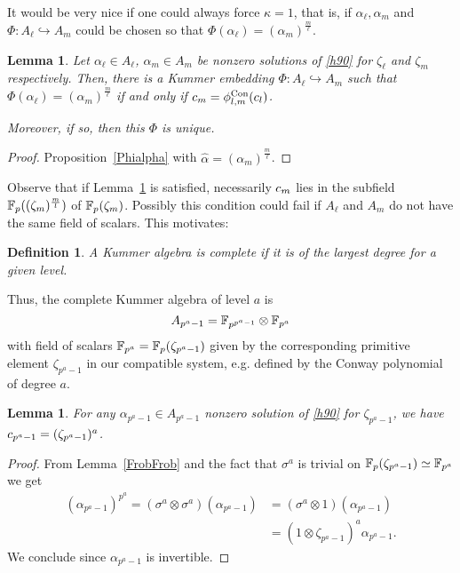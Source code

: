 \documentclass{sig-alternate}
\newtheorem{lemma}[theorem]{Lemma}
\newtheorem{definition}[theorem]{Definition}
\begin{document}
It would be very nice if one could always force $\kappa=1$, that is, if $\alpha_\ell,\alpha_m$
and $\Phi:A_\ell\hookrightarrow A_m$
could be chosen so that $\Phi(\alpha_\ell)=(\alpha_m)^{\frac{m}{\ell}}$.
\begin{lemma}
\label{power_compatibily}
Let $\alpha_\ell\in A_\ell$, $\alpha_m\in A_m$ be nonzero solutions of \eqref{h90} for $\zeta_\ell$
and $\zeta_m$ respectively. Then, there is a Kummer embedding $\Phi:A_\ell\hookrightarrow A_m$
such that $\Phi(\alpha_\ell)=(\alpha_m)^{\frac{m}{\ell}}$ if and only if $c_m={\phi^{\textrm{Con}}_{{l},{m}}}(c_l)$.

Moreover, if so, then this $\Phi$ is unique.
\end{lemma}
\begin{proof}
Proposition~\ref{Phialpha} with $\hat{\alpha}=(\alpha_m)^{\frac{m}{\ell}}$.
\end{proof}
Observe that if Lemma~\ref{power_compatibily} is satisfied,
necessarily $c_m$ lies in the subfield $\mathbb{F}_{p}((\zeta_m)^{\frac{m}{l}})$ of $\mathbb{F}_{p}(\zeta_m)$.
Possibly this condition could fail if $A_\ell$ and $A_m$ do not have the same field of scalars.
This motivates:
\begin{definition}
\label{complete}
A Kummer algebra is \emph{complete} if it is of the largest degree for a given level.
\end{definition}
Thus, the complete Kummer algebra of level $a$ is
\[ A_{p^a-1}=\mathbb{F}_{p^{p^a-1}}\otimes\mathbb{F}_{p^a} \]
with field of scalars $\mathbb{F}_{p^a}=\mathbb{F}_{p}(\zeta_{p^a-1})$ given by the corresponding primitive element $\zeta_{p^a-1}$ in our compatible system,
e.g. defined by the Conway polynomial of degree $a$.
\begin{lemma}
\label{Kummer_bizarre}
For any $\alpha_{p^a-1}\in A_{p^a-1}$ nonzero solution of \eqref{h90} for $\zeta_{p^a-1}$,
we have $c_{p^a-1}=(\zeta_{p^a-1})^a$.
\end{lemma}
\begin{proof}
From Lemma~\ref{FrobFrob} and the fact that $\sigma^a$ is trivial on $\mathbb{F}_{p}(\zeta_{p^a-1})\simeq\mathbb{F}_{p^a}$ we get
\begin{equation*}
\begin{split}
(\alpha_{p^a-1})^{p^a}=(\sigma^a\otimes\sigma^a)(\alpha_{p^a-1})&=(\sigma^a\otimes1)(\alpha_{p^a-1})\\
&=(1\otimes\zeta_{p^a-1})^a\alpha_{p^a-1}.
\end{split}
\end{equation*}
We conclude since $\alpha_{p^a-1}$ is invertible.
\end{proof}
\end{document}

